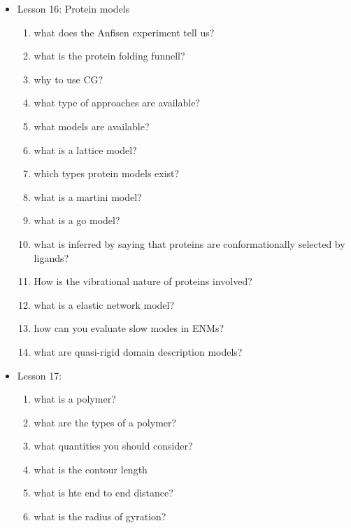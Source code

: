 {\begin{itemize}
\begin{enumerate}
        \item How do you find the minimum in the difference $\vec{f} - \vec{F}$
        \item What happens when all your interactions are all independent?
        \item How does $\chi^2$ differentiate himself from relative entropy?
        \item Why Force Matching does not produce very good radial distribution functions?
    \end{enumerate}
    \item Lesson 16: Protein models
    \begin{enumerate}
        \item what does the Anfisen experiment tell us?
        \item what is the protein folding funnell?
        \item why to use CG?
        \item what type of approaches are available?
        \item what models are available?
        \item what is a lattice model?
        \item which types protein models exist?
        \item what is a martini model?
        \item what is a go model?
        \item what is inferred by saying that proteins are conformationally selected by ligands?
        \item How is the vibrational nature of proteins involved?
        \item what is a elastic network model?
        \item how can you evaluate slow modes in ENMs?
        \item what are quasi-rigid domain description models?
    \end{enumerate}
    \item Lesson 17:
    \begin{enumerate}
        \item what is a polymer?
        \item what are the types of a polymer?
        \item what quantities you should consider?
        \item what is the contour length
        \item what is hte end to end distance?
        \item what is the radius of gyration?

\end{enumerate}
\end{itemize}}
